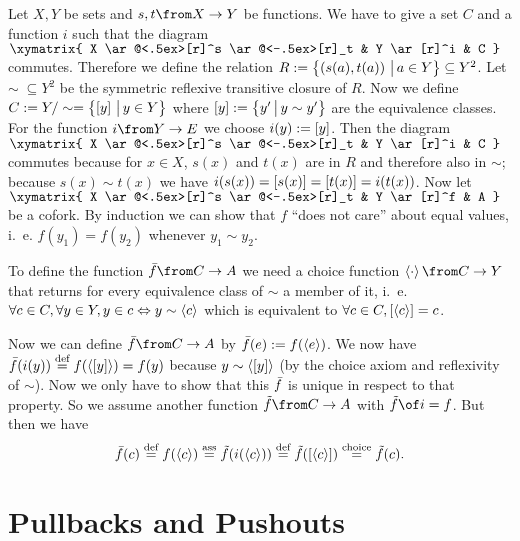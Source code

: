 \begin{example}
  \label{ex:coequa:quotient}
  Let $X, Y$ be sets and $s, t \from X \to Y$ be functions.
  We have to give a set $C$ and a function $i$ such that the diagram
  $ \xymatrix{
    X \ar@<.5ex>[r]^s \ar@<-.5ex>[r]_t & Y \ar[r]^i & C
  } $
  commutes.
  Therefore we define the relation
  $R := \bigl \{ \left( s(a) , t(a) \right) \,\big|\, a \in Y \bigr \} \subseteq Y^2$.
  Let $\sim \; \subseteq Y^2$ be the symmetric reflexive transitive closure of $R$.
  Now we define $C := Y / \sim = \bigl \{ \left[ y \right] \,\big|\, y \in Y \bigr \}$ where $\left[ y \right] := \bigl \{ y' \,\big|\, y \sim y' \bigr \}$ are the equivalence classes.
  For the function $i \from Y \to E$ we choose $i(y) := \left[ y \right]$.
  Then the diagram
  $ \xymatrix{
    X \ar@<.5ex>[r]^s \ar@<-.5ex>[r]_t & Y \ar[r]^i & C
  } $
  commutes because for $x \in X$, $s(x)$ and $t(x)$ are in $R$ and therefore also in $\sim$; because $s(x) \sim t(x)$ we have $i(s(x)) = \left[ s(x) \right] = \left[ t(x) \right] = i(t(x))$.
  Now let
  $ \xymatrix{
    X \ar@<.5ex>[r]^s \ar@<-.5ex>[r]_t & Y \ar[r]^f & A
  } $
  be a cofork.
  By induction we can show that $f$ ``does not care'' about equal values, i.~e. $f(y_1) = f(y_2)$ whenever $y_1 \sim y_2$.

  To define the function $\fbar \from C \to A$ we need a choice function $\choice \cdot \from C \to Y$ that returns for every equivalence class of $\sim$ a member of it, i.~e.
  $\forall c \in C, \forall y \in Y, y \in c \Leftrightarrow y \sim \left< c \right>$
  which is equivalent to $\forall c \in C, \left[ \left< c \right> \right] = c$.

  Now we can define $\fbar \from C \to A$ by $\bar{f}(e) := f(\left< e \right>)$.
  We now have  $\bar{f}(i(y)) \stackrel{\text{def}}{=} f(\left< \left[ y \right] \right>) = f(y)$ because $y \sim \left< \left[ y \right] \right>$ (by the choice axiom and reflexivity of $\sim$).
  Now we only have to show that this $\bar{f}$ is unique in respect to that property.
  So we assume another function $\ftilde \from C \to A$ with $\ftilde \of i = f$. But then we have
  $$ \bar{f}(c) \stackrel{\text{def}}{=} f(\left< c \right>) \stackrel{\text{ass}}{=} \tilde{f}(i(\left< c \right>)) \stackrel{\text{def}}{=} \tilde{f}(\left[ \left< c \right> \right]) \stackrel{\text{choice}}{=} \tilde{f}(c).$$
\end{example}


\section*{Pullbacks and Pushouts}

